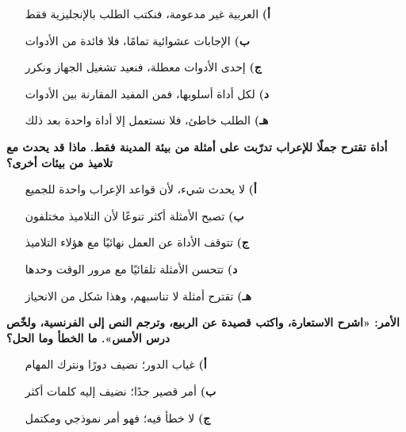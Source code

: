 \documentclass[11pt,a4paper]{article}
\begin{document}
\begin{multicols}{2}
\begin{minipage}{\linewidth}
\begin{itemize}[leftmargin=0.95cm, labelsep=4pt, itemsep=0pt, topsep=2pt, parsep=0pt]
  \item[\textbf{أ)}] العربية غير مدعومة، فنكتب الطلب بالإنجليزية فقط
  \item[\textbf{ب)}] الإجابات عشوائية تمامًا، فلا فائدة من الأدوات
  \item[\textbf{ج)}] إحدى الأدوات معطلة، فنعيد تشغيل الجهاز ونكرر
  \item[\textbf{د)}] لكل أداة أسلوبها، فمن المفيد المقارنة بين الأدوات
  \item[\textbf{هـ)}] الطلب خاطئ، فلا نستعمل إلا أداة واحدة بعد ذلك
\end{itemize}
\end{minipage}\par\vspace{7pt plus 4pt}
\noindent\begin{minipage}{\linewidth}
\hangindent=0.7cm\textbf{أداة تقترح جملًا للإعراب تدرّبت على أمثلة من بيئة المدينة فقط. ماذا قد يحدث مع تلاميذ من بيئات أخرى؟}
\begin{itemize}[leftmargin=0.95cm, labelsep=4pt, itemsep=0pt, topsep=2pt, parsep=0pt]
  \item[\textbf{أ)}] لا يحدث شيء، لأن قواعد الإعراب واحدة للجميع
  \item[\textbf{ب)}] تصبح الأمثلة أكثر تنوعًا لأن التلاميذ مختلفون
  \item[\textbf{ج)}] تتوقف الأداة عن العمل نهائيًا مع هؤلاء التلاميذ
  \item[\textbf{د)}] تتحسن الأمثلة تلقائيًا مع مرور الوقت وحدها
  \item[\textbf{هـ)}] تقترح أمثلة لا تناسبهم، وهذا شكل من الانحياز
\end{itemize}
\end{minipage}\par\vspace{7pt plus 4pt}
\noindent\begin{minipage}{\linewidth}
\hangindent=0.7cm\textbf{الأمر: «اشرح الاستعارة، واكتب قصيدة عن الربيع، وترجم النص إلى الفرنسية، ولخّص درس الأمس». ما الخطأ وما الحل؟}
\begin{itemize}[leftmargin=0.95cm, labelsep=4pt, itemsep=0pt, topsep=2pt, parsep=0pt]
  \item[\textbf{أ)}] غياب الدور؛ نضيف دورًا ونترك المهام
  \item[\textbf{ب)}] أمر قصير جدًا؛ نضيف إليه كلمات أكثر
  \item[\textbf{ج)}] لا خطأ فيه؛ فهو أمر نموذجي ومكتمل

\end{itemize}
\end{minipage}
\end{multicols}
\end{document}
